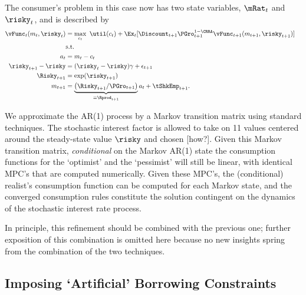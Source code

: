\documentclass[titlepage]{\econtex}
\begin{document}
The consumer's problem in this case now has two state variables, $\mRat_{t}$ and $\risky_{t}$, and 
is described by
\begin{equation}\begin{gathered}\begin{aligned}
  \null{\vFunc}_{t}({m}_{t},\risky_{t})  & = \max_{{c}_{t}} ~ \util({c}_{t})+
                                              \Ex_{t}[{\Discount}_{t+1}\PGro_{t+1}^{1-\CRRA}\null{\vFunc}_{t+1}({m}_{t+1},\risky_{t+1})] \label{vtNormRisky}
  \\         & \text{s.t.} &   \nonumber \\
  {a}_{t}    & = {m}_{t}-{c}_{t} \nonumber
  \\      \risky_{t+1}-\risky  & = (\risky_{t}-\risky)\gamma + \epsilon_{t+1} \notag
  \\      \Risky_{t+1}  & = \exp(\risky_{t+1}) \notag
  \\      {m}_{t+1}  & = \underbrace{\left(\Risky_{t+1}/\PGro_{t+1}\right)}_{\equiv \Rprod_{t+1}}{a}_{t}+\tShkEmp_{t+1} \nonumber.
\end{aligned}\end{gathered}\end{equation}


We approximate the AR(1) process by a Markov transition matrix using standard techniques.  The stochastic interest factor is allowed to take 
on 11 values centered around the steady-state value $\risky$ and chosen [how?].  Given this Markov transition matrix,
\textit{conditional} on the Markov AR(1) state the consumption functions for the `optimist' and the `pessimist' will still be linear, 
with identical MPC's that are computed numerically.  Given these MPC's, the (conditional) realist's consumption function can be computed for each Markov state, and the converged consumption rules constitute the solution contingent on the dynamics of the stochastic
interest rate process.  

In principle, this refinement should be combined with the previous one;
further exposition of this combination is omitted here because no new
insights spring from the combination of the two techniques.



\hypertarget{Imposing-Artificial-Borrowing-Constraints}{}
\subsection{Imposing `Artificial' Borrowing Constraints}
\end{document}
